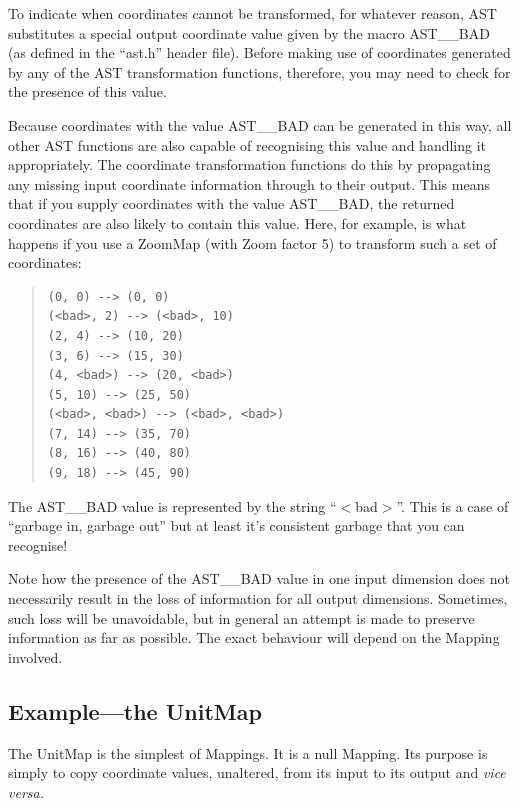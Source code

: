 \documentclass[twoside,11pt]{article}
\newcommand{\htmlref}[2]{#1}
\begin{document}
To indicate when coordinates cannot be transformed, for whatever
reason, AST substitutes a special output coordinate value given by the
macro AST\_\_BAD (as defined in the ``ast.h'' header file).  Before
making use of coordinates generated by any of the AST transformation
functions, therefore, you may need to check for the presence of this
value.

Because coordinates with the value AST\_\_BAD can be generated in this
way, all other AST functions are also capable of recognising this
value and handling it appropriately. The coordinate transformation
functions do this by propagating any missing input coordinate
information through to their output.  This means that if you supply
coordinates with the value AST\_\_BAD, the returned coordinates are
also likely to contain this value. Here, for example, is what happens
if you use a \htmlref{ZoomMap}{ZoomMap} (with \htmlref{Zoom}{Zoom} factor 5) to transform such a set of
coordinates:

\begin{quote}
\small
\begin{verbatim}
(0, 0) --> (0, 0)
(<bad>, 2) --> (<bad>, 10)
(2, 4) --> (10, 20)
(3, 6) --> (15, 30)
(4, <bad>) --> (20, <bad>)
(5, 10) --> (25, 50)
(<bad>, <bad>) --> (<bad>, <bad>)
(7, 14) --> (35, 70)
(8, 16) --> (40, 80)
(9, 18) --> (45, 90)
\end{verbatim}
\normalsize
\end{quote}

The AST\_\_BAD value is represented by the string ``$<$bad$>$''. This
is a case of ``garbage in, garbage out'' but at least it's consistent
garbage that you can recognise!

Note how the presence of the AST\_\_BAD value in one input dimension
does not necessarily result in the loss of information for all output
dimensions. Sometimes, such loss will be unavoidable, but in general
an attempt is made to preserve information as far as possible. The
exact behaviour will depend on the Mapping involved.

\subsection{\label{ss:unitmapexample}Example---the UnitMap}

The \htmlref{UnitMap}{UnitMap} is the simplest of Mappings. It is a null \htmlref{Mapping}{Mapping}. Its
purpose is simply to copy coordinate values, unaltered, from its input
to its output and {\em{vice versa.}}
\end{document}
